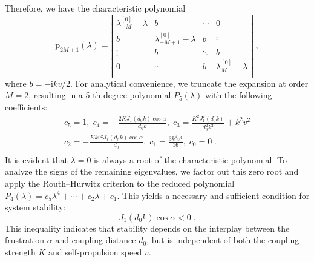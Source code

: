 \documentclass{article}
\begin{document}
Therefore, we have the characteristic polynomial
\begin{equation}
        \mathrm{p}_{2M+1}\left( \lambda \right) =\left| \begin{matrix}
        \lambda _{-M}^{\left[ 0 \right]}-\lambda&		b&		\cdots&		0\\
        b&		\lambda _{-M+1}^{\left[ 0 \right]}-\lambda&		b&		\vdots\\
        \vdots&		b&		\ddots&		b\\
        0&		\cdots&		b&		\lambda _{M}^{\left[ 0 \right]}-\lambda\\
    \end{matrix} \right|\;,
    \label{eq:characteristicPolynomial}
\end{equation}
where $b=-\mathrm{i}kv/2$. For analytical convenience, we truncate the expansion at order $M=2$, resulting in a 5-th degree polynomial $P_5(\lambda)$ with the following coefficients:
\begin{equation}
    \begin{array}{c}
	c_5=1,\;c_4=-\frac{2KJ_1\left( d_0k \right) \cos \alpha}{d_0k},\;c_3=\frac{K^2J_{1}^{2}\left( d_0k \right)}{d_{0}^{2}k^2}+k^2v^2\\
	c_2=-\frac{Kkv^2J_1\left( d_0k \right) \cos \alpha}{d_0},\;c_1=\frac{3k^4v^4}{16},\;c_0=0\;.\\
\end{array}
\end{equation}
It is evident that $\lambda =0$ is always a root of the characteristic polynomial. To analyze the signs of the remaining eigenvalues, we factor out this zero root and apply the Routh–Hurwitz criterion to the reduced polynomial $P_4\left( \lambda \right) =c_5\lambda ^4+\cdots +c_2\lambda +c_1$. This yields a necessary and sufficient condition for system stability:
\begin{equation}
    J_1\left( d_0k \right) \cos \alpha <0\;.
\end{equation}
This inequality indicates that stability depends on the interplay between the frustration $\alpha$ and coupling distance $d_0$, but is independent of both the coupling strength $K$ and self-propulsion speed $v$. 
\end{document}
